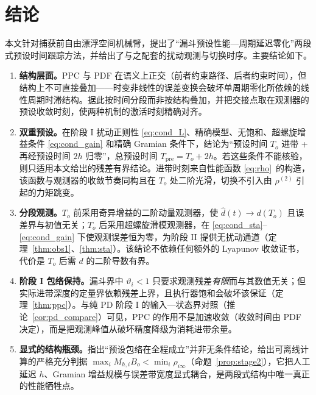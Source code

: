 \section{结论}
\label{sec:conclusion}

本文针对捕获前自由漂浮空间机械臂，提出了“漏斗预设性能—周期延迟零化”两段式预设时间跟踪方法，并给出了与之配套的扰动观测与切换时序。主要结论如下。

\begin{enumerate}
  \item \textbf{结构层面。}PPC 与 PDF 在语义上正交（前者约束路径、后者约束时间），但结构上不可直接叠加——时变非线性的误差变换会破坏单周期零化所依赖的线性周期时滞结构。据此按时间分段而非按结构叠加，并把交接点取在观测器的预设收敛时刻，使两种机制的激活时刻精确对齐。

  \item \textbf{双重预设。}在阶段 I 扰动正则性 \eqref{eq:cond_L}、精确模型、无饱和、超螺旋增益条件 \eqref{eq:cond_gain} 和精确 Gramian 条件下，结论为“预设时间 \(T_o\) 进带 + 再经预设时间 \(2h\) 归零”，总预设时间 \(T_{\mathrm{pre}}=T_o+2h\)。若这些条件不能核验，则只适用本文给出的残差有界结论。进带时刻来自性能函数 \eqref{eq:rho}~的构造，该函数与观测器的收敛节奏同构且在 \(T_o\) 处二阶光滑，切换不引入由 \(\rho^{(2)}\) 引起的力矩跳变。
  \item \textbf{分段观测。}\(T_o\) 前采用奇异增益的二阶动量观测器，使 \(\hat d(t)\to d(T_o)\) 且误差界与初值无关；\(T_o\) 后采用超螺旋滑模观测器，在 \eqref{eq:cond_sta}--\eqref{eq:cond_gain} 下使观测误差恒为零，为阶段 II 提供无扰动通道（定理~\ref{thm:obs1}、\ref{thm:sta}）。该结论不依赖任何额外的 Lyapunov 收敛证书，代价是 \(T_o\) 后需 \(d\) 的二阶导数有界。

  \item \textbf{阶段 I 包络保持。}漏斗界中 \(\vartheta_i<1\) 只要求观测残差\emph{有限}而与其数值无关；但实际进带深度的定量界依赖残差上界，且执行器饱和会破坏该保证（定理~\ref{thm:ppc}）。与纯 PD 阶段 I 的输入—状态界对照（推论~\ref{cor:pd_compare}）可见，PPC 的作用不是加速收敛（收敛时间由 PDF 决定），而是把观测峰值从破坏精度降级为消耗进带余量。

  \item \textbf{显式的结构瓶颈。}指出“预设包络在全程成立”并非无条件结论，给出可离线计算的严格充分判据 \(\max_iM_{h,i}B_o<\min_i\rho_{i\infty}\)（命题~\ref{prop:stage2}），它把人工延迟 \(h\)、Gramian 增益规模与误差带宽度显式耦合，是两段式结构中唯一真正的性能牺牲点。


\end{enumerate}
